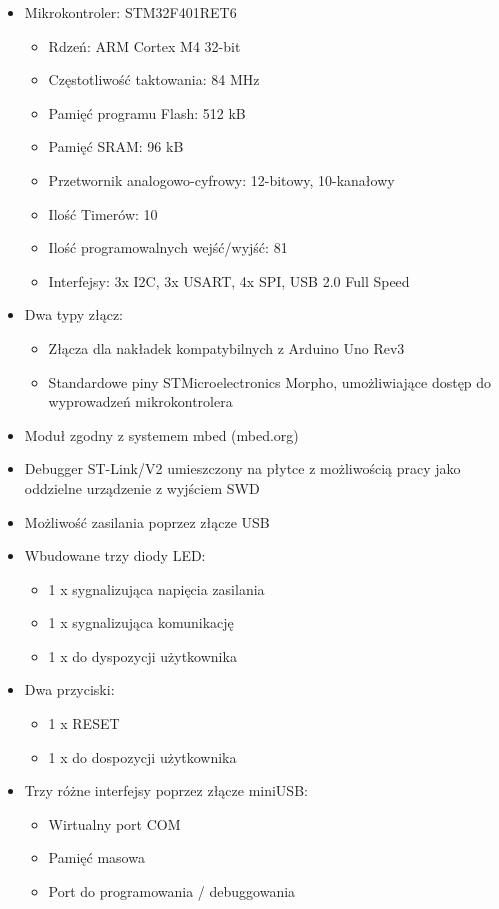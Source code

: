\begin{itemize}
	\item Mikrokontroler: STM32F401RET6
    \begin{itemize}[label=$\star$]
        \item Rdzeń: ARM Cortex M4 32-bit
        \item Częstotliwość taktowania: 84 MHz
        \item Pamięć programu Flash: 512 kB
        \item Pamięć SRAM: 96 kB
        \item Przetwornik analogowo-cyfrowy: 12-bitowy, 10-kanałowy
        \item Ilość Timerów: 10
        \item Ilość programowalnych wejść/wyjść: 81
        \item Interfejsy: 3x I2C, 3x USART, 4x SPI, USB 2.0 Full Speed
    \end{itemize}
	\item Dwa typy złącz:
    \begin{itemize}[label=$\star$]
	    \item Złącza dla nakładek kompatybilnych z Arduino Uno Rev3
        \item Standardowe piny STMicroelectronics Morpho, umożliwiające dostęp do wyprowadzeń mikrokontrolera
    \end{itemize}
    \item Moduł zgodny z systemem mbed (mbed.org)
    \item Debugger ST-Link/V2 umieszczony na płytce z możliwością pracy jako oddzielne urządzenie z wyjściem SWD
    \item Możliwość zasilania poprzez złącze USB
    \item Wbudowane trzy diody LED:
    \begin{itemize}[label=$\star$]
        \item 1 x sygnalizująca napięcia zasilania
        \item 1 x sygnalizująca komunikację
        \item 1 x do dyspozycji użytkownika
    \end{itemize}
    \item Dwa przyciski:
    \begin{itemize}[label=$\star$]
        \item 1 x RESET
        \item 1 x do dospozycji użytkownika
    \end{itemize}
    \item Trzy różne interfejsy poprzez złącze miniUSB:
    \begin{itemize}[label=$\star$]
        \item Wirtualny port COM
        \item Pamięć masowa
        \item Port do programowania / debuggowania
    \end{itemize}
\end{itemize}

